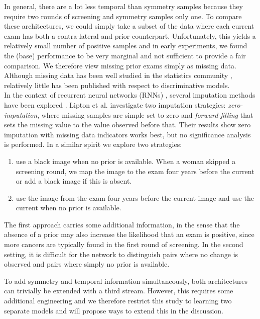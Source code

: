 \documentclass[12pt]{spieman}  %
\begin{document}
In general, there are a lot less temporal than symmetry samples because they require two rounds of screening and symmetry samples only one. To compare these architectures, we could simply take a subset of the data where each current exam has both a contra-lateral and prior counterpart. Unfortunately, this yields a relatively small number of positive samples and in early experiments, we found the (base) performance to be very marginal and not sufficient to provide a fair comparison. We therefore view missing prior exams simply as missing data. Although missing data has been well studied in the statistics community \cite{Alli01}, relatively little has been published with respect to discriminative models. \\

In the context of recurrent neural networks (RNNs) \cite{Grav12, Gref15, Lipt15a}, several imputation methods have been explored \cite{Che16, Zach16}. Lipton et al. \cite{Zach16} investigate two imputation strategies: {\it zero-imputation}, where missing samples are simple set to zero and {\it forward-filling} that sets the missing value to the value observed before that. Their results show zero imputation with missing data indicators works best, but no significance analysis is performed. In a similar spirit we explore two strategies:
\begin{enumerate}
 \item use a black image when no prior is available. When a woman skipped a screening round, we map the image to the exam four years before the current or add a black image if this is absent.
 \item use the image from the exam four years before the current image and use the current when no prior is available. 
\end{enumerate}
The first approach carries some additional information, in the sense that the absence of a prior may also increase the likelihood that an exam is positive, since more cancers are typically found in the first round of screening. In the second setting, it is difficult for the network to distinguish pairs where no change is observed and pairs where simply no prior is available. 


To add symmetry and temporal information simultaneously, both architectures can trivially be extended with a third stream. However, this requires some additional engineering and we therefore restrict this study to learning two separate models and will propose ways to extend this in the discussion. 
\end{document}

